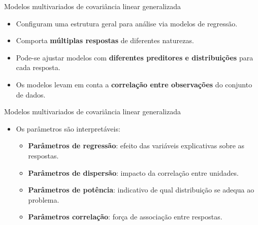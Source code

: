 \documentclass[
  ignorenonframetext,
  serif,
  professionalfont,
  usenames,
  dvipsnames,
  aspectratio = 169]{beamer}
\begin{document}
\begin{frame}{Modelos multivariados de covariância linear generalizada}
\protect\hypertarget{modelos-multivariados-de-covariuxe2ncia-linear-generalizada-1}{}
\begin{itemize}
   
   \itemsep 2ex
   
  \item Configuram uma estrutura geral para análise via modelos de regressão.
  
  \item Comporta \textbf{múltiplas respostas} de diferentes naturezas.
  
  \item Pode-se ajustar modelos com \textbf{diferentes preditores e distribuições} para cada resposta.
  
  \item Os modelos levam em conta a \textbf{correlação entre observações} do conjunto de dados. 

\end{itemize}
\end{frame}

\begin{frame}{Modelos multivariados de covariância linear generalizada}
\protect\hypertarget{modelos-multivariados-de-covariuxe2ncia-linear-generalizada-2}{}
\begin{itemize}
   
   \itemsep 2ex
  
  \item Os parâmetros são interpretáveis:
  
    \begin{itemize}
    
    \itemsep 2ex
      
      \item \textbf{Parâmetros de regressão}: efeito das variáveis explicativas sobre as respostas.
      
      \item \textbf{Parâmetros de dispersão}: impacto da correlação entre unidades.
      
      \item \textbf{Parâmetros de potência}: indicativo de qual distribuição se adequa ao problema.
      
      \item \textbf{Parâmetros correlação}: força de associação entre respostas.
      
    \end{itemize}

\end{itemize}
\end{frame}
\end{document}
